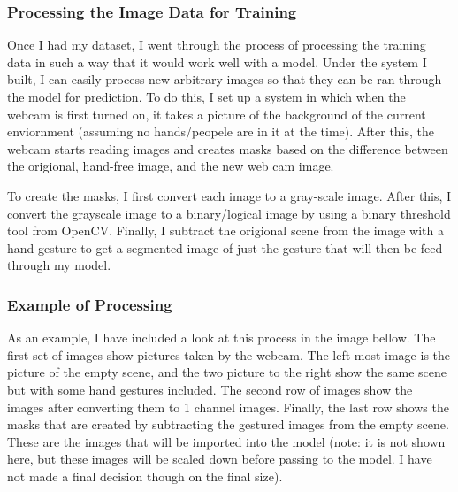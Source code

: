 \documentclass[9pt]{article}
\begin{document}
\subsubsection{Processing the Image Data for Training}

Once I had my dataset, I went through the process of processing the training data in such a way that it would work well with a model. Under the system I built, I can easily process new arbitrary images so that they can be ran through the model for prediction. To do this, I set up a system in which when the webcam is first turned on, it takes a picture of the background of the current enviornment (assuming no hands/peopele are in it at the time). After this, the webcam starts reading images and creates masks based on the difference between the origional, hand-free image, and the new web cam image. 

To create the masks, I first convert each image to a gray-scale image. After this, I convert the grayscale image to a binary/logical image by using a binary threshold tool from OpenCV. Finally, I subtract the origional scene from the image with a hand gesture to get a segmented image of just the gesture that will then be feed through my model. 
 
\subsubsection{Example of Processing}

As an example, I have included a look at this process in the image bellow. The first set of images show pictures taken by the webcam. The left most image is the picture of the empty scene, and the two picture to the right show the same scene but with some hand gestures included. The second row of images show the images after converting them to 1 channel images. Finally, the last row shows the masks that are created by subtracting the gestured images from the empty scene. These are the images that will be imported into the model (note: it is not shown here, but these images will be scaled down before passing to the model. I have not made a final decision though on the final size).
\end{document}
